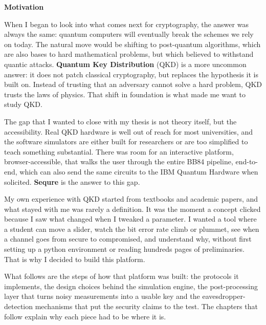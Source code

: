 \documentclass[12pt, a4paper]{article}
\begin{document}
\newpage
\thispagestyle{plain}
\begin{center}
  {\Large \textbf{Motivation}}
\end{center}
\vspace{10pt} 

\noindent

When I began to look into what comes next for cryptography, the answer was always the same: quantum computers will eventually break the schemes we rely on today. The natural move would be shifting to post-quantum algorithms, which are also bases to hard mathematical problems, but which believed to withstand quantic attacks. \textbf{Quantum Key Distribution} (QKD) is a more uncommon answer: it does not patch classical cryptography, but replaces the hypothesis it is built on. Instead of trusting that an adversary cannot solve a hard problem, QKD trusts the laws of physics. That shift in foundation is what made me want to study QKD.

The gap that I wanted to close with my thesis is not theory itself, but the accessibility. Real QKD hardware is well out of reach for most universities, and the  software simulators are either built for researchers or are too simplified to teach something substantial. There was room for an interactive platform, browser-accessible, that walks the user through the entire BB84 pipeline, end-to-end, which can also send the same circuits to the IBM Quantum Hardware when solicited. \textbf{Sequre} is the answer to this gap.

My own experience with QKD started from textbooks and academic papers,
and what stayed with me was rarely a definition. It was the moment a
concept clicked because I saw what changed when I tweaked a parameter.
I wanted a tool where a student can move a slider, watch the bit error
rate climb or plummet, see when a channel goes from secure to compromised, and understand why, without first setting up a python environment or reading
hundreds pages of preliminaries. That is why I decided to build this platform.

What follows are the steps of how that platform was built: the protocols
it implements, the design choices behind the simulation engine, the
post-processing layer that turns noisy measurements into a usable key 
and the eavesdropper-detection mechanisms that put the security claims
to the test. The chapters that follow explain why each piece had to be
where it is.
\end{document}
